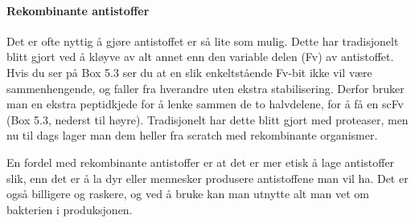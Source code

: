 \paragraph{Rekombinante antistoffer} Det er ofte nyttig å gjøre antistoffet er så lite som mulig. Dette har tradisjonelt blitt gjort ved å kløyve av alt annet enn den variable delen (Fv) av antistoffet. Hvis du ser på Box 5.3 ser du at en slik enkeltstående Fv-bit ikke vil være sammenhengende, og faller fra hverandre uten ekstra stabilisering. Derfor bruker man en ekstra peptidkjede for å lenke sammen de to halvdelene, for å få en scFv (Box 5.3, nederst til høyre). Tradisjonelt har dette blitt gjort med proteaser, men nu til dags lager man dem heller fra scratch med rekombinante organismer.

En fordel med rekombinante antistoffer er at det er mer etisk å lage antistoffer slik, enn det er å la dyr eller mennesker produsere antistoffene man vil ha. Det er også billigere og raskere, og ved å bruke  kan man utnytte alt man vet om bakterien i produksjonen.

